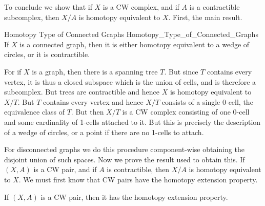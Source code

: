         To conclude we show that if $X$ is a CW complex, and if $A$ is a
        contractible subcomplex, then $X/A$ is homotopy equivalent to
        $X$. First, the main result.
        \begin{ftheorem}{Homotopy Type of Connected Graphs}
                        {Homotopy_Type_of_Connected_Graphs}
            If $X$ is a connected graph, then it is either homotopy
            equivalent to a wedge of circles, or it is contractible.
        \end{ftheorem}
        \begin{bproof}
            For if $X$ is a graph, then there is a spanning tree $T$.
            But since $T$ contains every vertex, it is thus a closed
            subspace which is the union of cells, and is therefore a
            subcomplex. But trees are contractible and hence $X$ is
            homotopy equivalent to $X/T$. But $T$ contains every vertex
            and hence $X/T$ consists of a single 0-cell, the equivalence
            class of $T$. But then $X/T$ is a CW complex consisting of
            one 0-cell and some cardinality of 1-cells attached to it.
            But this is precisely the description of a wedge of circles,
            or a point if there are no 1-cells to attach.
        \end{bproof}
        For disconnected graphs we do this procedure component-wise
        obtaining the disjoint union of such spaces. Now we prove the
        result used to obtain this. If $(X,A)$ is a CW pair, and if $A$
        is contractible, then $X/A$ is homotopy equivalent to $X$. We
        must first know that CW pairs have the homotopy extension
        property.
        \begin{theorem}
            If $(X,A)$ is a CW pair, then it has the homotopy extension
            property.
        \end{theorem}
